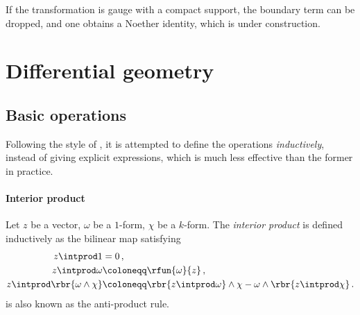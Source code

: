 \documentclass[a4paper]{article}
\begin{document}
If the transformation is gauge with a compact support, the boundary term can be
dropped, and one obtains a Noether identity, which is under construction.




\cite{Avery2015}


\appendix

\section{Differential geometry}


\subsection{Basic operations}

Following the style of \cite{Burke1985}, it is attempted to define 
the operations \emph{inductively}, instead of giving explicit expressions, 
which is much less effective than the former in practice.

\paragraph{Interior product}

Let $z$ be a vector, $\omega$ be a $1$-form, $\chi$ be a $k$-form. 
The \emph{interior product} is defined inductively as the bilinear map
satisfying
\begin{align}
z \intprod 1 &= 0\,,
\\
z \intprod \omega &\coloneqq \rfun{\omega}{z}\,,
\\
z \intprod \rbr{\omega \wedge \chi} &\coloneqq
	\rbr{z\intprod\omega}\wedge \chi - \omega \wedge \rbr{z\intprod \chi}\,.
\label{eq:anti-prod-100}
\end{align}
 is also known as the anti-product rule.
\end{document}

